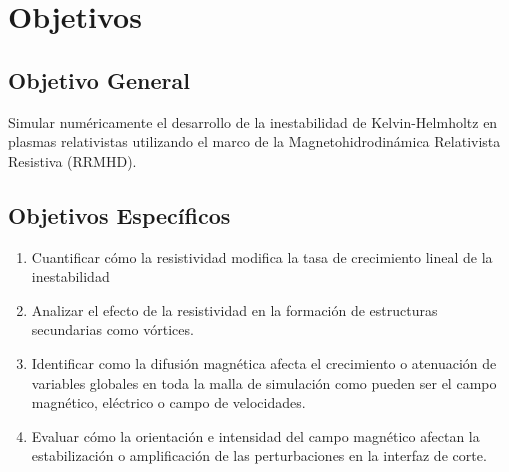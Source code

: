 \section{Objetivos}
\subsection{Objetivo General}
\noindent Simular numéricamente el desarrollo de la inestabilidad de Kelvin-Helmholtz en plasmas relativistas utilizando el marco de la Magnetohidrodinámica Relativista Resistiva (RRMHD).
\subsection{Objetivos Específicos}
\begin{enumerate}
    \item Cuantificar cómo la resistividad modifica la tasa de crecimiento lineal de la inestabilidad
    \item Analizar el efecto de la resistividad en la formación de estructuras secundarias como vórtices.
    \item Identificar como la difusión magnética afecta el crecimiento o atenuación de variables globales en toda la malla de simulación como pueden ser el campo magnético, eléctrico o campo de velocidades.
    \item Evaluar cómo la orientación e intensidad del campo magnético afectan la estabilización o amplificación de las perturbaciones en la interfaz de corte.
\end{enumerate}

